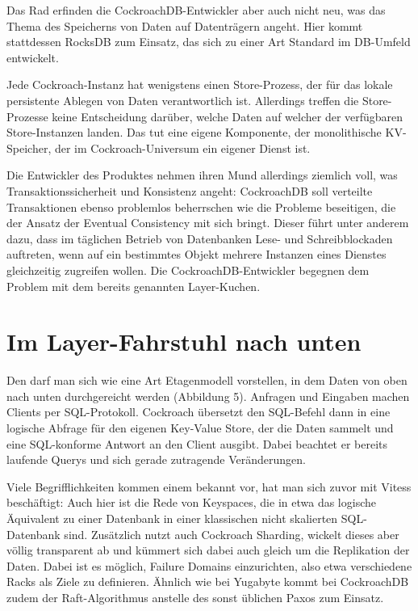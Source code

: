 Das Rad erfinden die CockroachDB-Entwickler aber auch nicht neu, was das Thema des Speicherns von Daten auf Datenträgern angeht. Hier kommt stattdessen RocksDB zum Einsatz, das sich zu einer Art Standard im DB-Umfeld entwickelt.

Jede Cockroach-Instanz hat wenigstens einen Store-Prozess, der für das lokale persistente Ablegen von Daten verantwortlich ist. Allerdings treffen die Store-Prozesse keine Entscheidung darüber, welche Daten auf welcher der verfügbaren Store-Instanzen landen. Das tut eine eigene Komponente, der monolithische KV-Speicher, der im Cockroach-Universum ein eigener Dienst ist.

Die Entwickler des Produktes nehmen ihren Mund allerdings ziemlich voll, was Transaktionssicherheit und Konsistenz angeht: CockroachDB soll verteilte Transaktionen ebenso problemlos beherrschen wie die Probleme beseitigen, die der Ansatz der Eventual Consistency mit sich bringt. Dieser führt unter anderem dazu, dass im täglichen Betrieb von Datenbanken Lese- und Schreibblockaden auftreten, wenn auf ein bestimmtes Objekt mehrere Instanzen eines Dienstes gleichzeitig zugreifen wollen. Die CockroachDB-Entwickler begegnen dem Problem mit dem bereits genannten Layer-Kuchen.

\section{Im Layer-Fahrstuhl nach unten}


Den darf man sich wie eine Art Etagenmodell vorstellen, in dem Daten von oben nach unten durchgereicht werden (Abbildung 5). Anfragen und Eingaben machen Clients per SQL-Protokoll. Cockroach übersetzt den SQL-Befehl dann in eine logische Abfrage für den eigenen Key-Value Store, der die Daten sammelt und eine SQL-konforme Antwort an den Client ausgibt. Dabei beachtet er bereits laufende Querys und sich gerade zutragende Veränderungen.

Viele Begrifflichkeiten kommen einem bekannt vor, hat man sich zuvor mit Vitess beschäftigt: Auch hier ist die Rede von Keyspaces, die in etwa das logische Äquivalent zu einer Datenbank in einer klassischen nicht skalierten SQL-Datenbank sind. Zusätzlich nutzt auch Cockroach Sharding, wickelt dieses aber völlig transparent ab und kümmert sich dabei auch gleich um die Replikation der Daten. Dabei ist es möglich, Failure Domains einzurichten, also etwa verschiedene Racks als Ziele zu definieren. Ähnlich wie bei Yugabyte kommt bei CockroachDB zudem der Raft-Algorithmus anstelle des sonst üblichen Paxos zum Einsatz.

